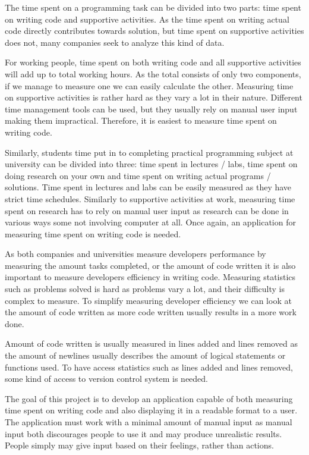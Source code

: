 The time spent on a programming task can be divided into two parts: time spent on writing code and supportive activities.
As the time spent on writing actual code directly contributes towards solution, but time spent on supportive activities does not,
many companies seek to analyze this kind of data.

For working people, time spent on both writing code and all supportive activities will add up to total working hours.
As the total consists of only two components, if we manage to measure one we can easily calculate the other.
Measuring time on supportive activities is rather hard as they vary a lot in their nature.
Different time management tools can be used, but they usually rely on manual user input making them impractical.
Therefore, it is easiest to measure time spent on writing code.

Similarly, students time put in to completing practical programming subject at university can be divided into three: time spent in lectures / labs,
time spent on doing research on your own and time spent on writing actual programs / solutions.
Time spent in lectures and labs can be easily measured as they have strict time schedules.
Similarly to supportive activities at work, measuring time spent on research has to rely on manual user input as research can be done in various ways some not involving computer at all.
Once again, an application for measuring time spent on writing code is needed.

As both companies and universities measure developers performance by measuring the amount tasks completed,
or the amount of code written it is also important to measure developers efficiency in writing code.
Measuring statistics such as problems solved is hard as problems vary a lot, and their difficulty is complex to measure.
To simplify measuring developer efficiency we can look at the amount of code written as more code written usually results in a more work done.

Amount of code written is usually measured in lines added and lines removed as the amount of newlines usually describes the amount
of logical statements or functions used.
To have access statistics such as lines added and lines removed, some kind of access to version control system is needed.

The goal of this project is to develop an application capable of both measuring time spent on writing code and also
displaying it in a readable format to a user.
The application must work with a minimal amount of manual input as manual input both discourages people to use it and may produce
unrealistic results.
People simply may give input based on their feelings, rather than actions.


